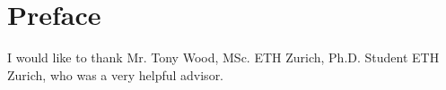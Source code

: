 

%
%
%
%




 

\chapter*{Preface}

I would like to thank Mr. Tony Wood, MSc. ETH Zurich, Ph.D. Student ETH Zurich, who was a very helpful advisor.

 \cleardoublepage





 \setcounter{tocdepth}{2}
 \tableofcontents

 \cleardoublepage


%
%
%
 \cleardoublepage

